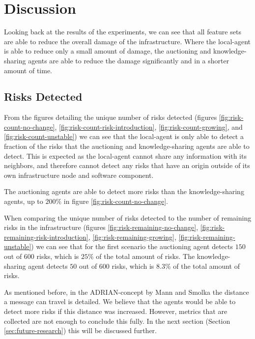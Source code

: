 \section{Discussion}
\label{sec:discussion}
Looking back at the results of the experiments, we can see that all feature sets are able to reduce the overall damage of the infrastructure. Where the local-agent is able to reduce only a small amount of damage, the auctioning and knowledge-sharing agents are able to reduce the damage significantly and in a shorter amount of time. 

\subsection{Risks Detected}
From the figures detailing the unique number of risks detected (figures \ref{fig:risk-count-no-change}, \ref{fig:risk-count-risk-introduction}, \ref{fig:risk-count-growing}, and \ref{fig:risk-count-unstable}) we can see that the local-agent is only able to detect a fraction of the risks that the auctioning and knowledge-sharing agents are able to detect. This is expected as the local-agent cannot share any information with its neighbors, and therefore cannot detect any risks that have an origin outside of its own infrastructure node and software component.

The auctioning agents are able to detect more risks than the knowledge-sharing agents, up to $200\%$ in figure \ref{fig:risk-count-no-change}. 

When comparing the unique number of risks detected to the number of remaining risks in the infrastructure (figures \ref{fig:risk-remaining-no-change}, \ref{fig:risk-remaining-risk-introduction}, \ref{fig:risk-remaining-growing}, \ref{fig:risk-remaining-unstable}) we can see that for the first scenario the auctioning agent detects $150$ out of $600$ risks, which is $25\%$ of the total amount of risks. The knowledge-sharing agent detects $50$ out of $600$ risks, which is $8.3\%$ of the total amount of risks. 

As mentioned before, in the ADRIAN-concept by Mann and Smolka \cite{mann2023ADRIAN} the distance a message can travel is detailed. We believe that the agents would be able to detect more risks if this distance was increased. However, metrics that are collected are not enough to conclude this fully. In the next section (Section \ref{sec:future-research}) this will be discussed further.

